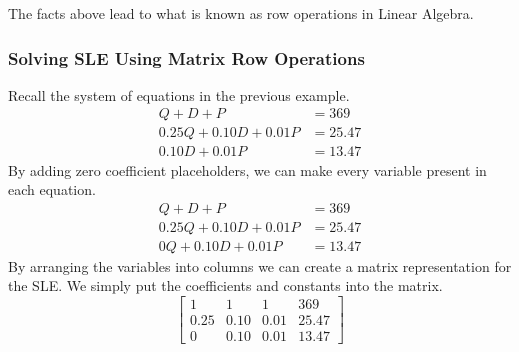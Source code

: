 The facts above lead to what is known as row operations in Linear Algebra.

\subsubsection*{Solving SLE Using Matrix Row Operations}
Recall the system of equations in the previous example.
\begin{align*}
    Q + D + P &= 369 \\
    0.25Q + 0.10D + 0.01P &= 25.47 \\
    0.10D + 0.01P &= 13.47
\end{align*}
By adding zero coefficient placeholders, we can make every variable present in each equation.
\begin{align*}
    Q + D + P &= 369 \\
    0.25Q + 0.10D + 0.01P &= 25.47 \\
    0Q + 0.10D + 0.01P &= 13.47
\end{align*}
By arranging the variables into columns we can create a matrix representation for the SLE.  We simply put the coefficients and constants into the matrix.
\[
\begin{bmatrix}
1 & 1 & 1 & 369 \\
0.25 & 0.10 & 0.01 & 25.47 \\
0 & 0.10 & 0.01 & 13.47
\end{bmatrix}
\]

